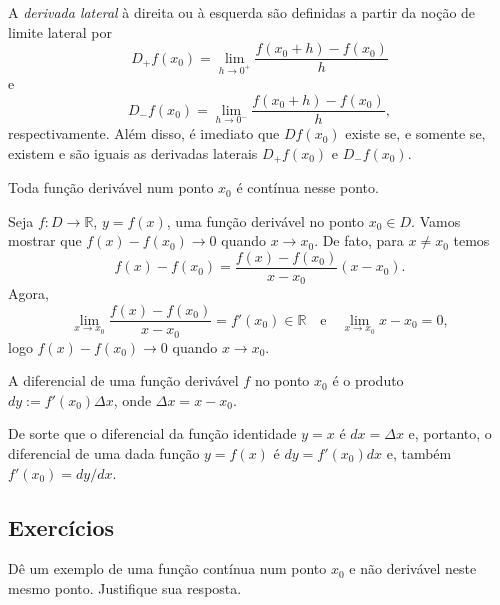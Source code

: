 \begin{obs}
  A \emph{derivada lateral} à direita ou à esquerda são definidas a partir da noção de limite lateral por
  \begin{equation}
    D_+f(x_0) = \lim_{h\to 0^+} \frac{f(x_0+h) - f(x_0)}{h}
  \end{equation}
  e
  \begin{equation}
    D_-f(x_0) = \lim_{h\to 0^-} \frac{f(x_0+h) - f(x_0)}{h},
  \end{equation}
  respectivamente. Além disso, é imediato que $Df(x_0)$ existe se, e somente se, existem e são iguais as derivadas laterais $D_+f(x_0)$ e $D_-f(x_0)$.
\end{obs}

\begin{teo}
  Toda função derivável num ponto $x_0$ é contínua nesse ponto.
\end{teo}
\begin{dem}
  Seja $f:D\to\mathbb{R}$, $y=f(x)$, uma função derivável no ponto $x_0\in D$. Vamos mostrar que $f(x)-f(x_0)\to 0$ quando $x\to x_0$. De fato, para $x\neq x_0$ temos
  \begin{equation}
    f(x) - f(x_0) = \frac{f(x) - f(x_0)}{x-x_0}(x-x_0).
  \end{equation}
Agora, 
\begin{equation}
  \lim_{x\to x_0} \frac{f(x) - f(x_0)}{x-x_0} = f'(x_0)\in\mathbb{R}\quad\text{e}\quad\lim_{x\to x_0} x-x_0 = 0,
\end{equation}
logo $f(x)-f(x_0)\to 0$ quando $x\to x_0$.
\end{dem}

\begin{defn}
  A diferencial de uma função derivável $f$ no ponto $x_0$ é o produto $dy := f'(x_0)\Delta x$, onde $\Delta x = x-x_0$.
\end{defn}

\begin{obs}
  De sorte que o diferencial da função identidade $y = x$ é $dx = \Delta x$ e, portanto, o diferencial de uma dada função $y = f(x)$ é $dy = f'(x_0)dx$ e, também $f'(x_0) = dy/dx$.
\end{obs}

\subsection*{Exercícios}

\begin{exer}
  Dê um exemplo de uma função contínua num ponto $x_0$ e não derivável neste mesmo ponto. Justifique sua resposta.
\end{exer}

